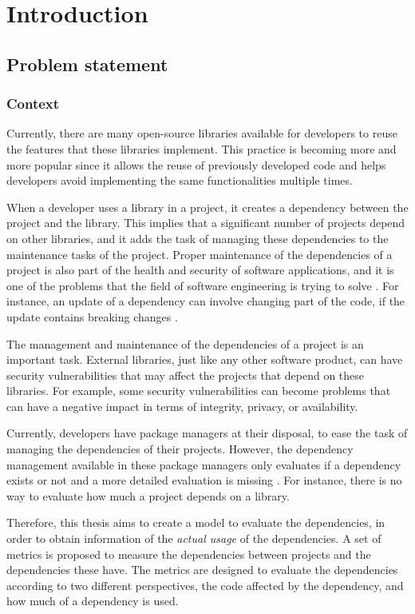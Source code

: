 \chapter{Introduction}\label{ch:Introduction}

\section{Problem statement}

\subsection{Context}
Currently, there are many open-source libraries available for developers to reuse the features that these libraries implement. This practice is becoming more and more popular since it allows the reuse of previously developed code and helps developers avoid implementing the same functionalities multiple times.

When a developer uses a library in a project, it creates a dependency between the project and the library. This implies that a significant number of projects depend on other libraries, and it adds the task of managing these dependencies to the maintenance tasks of the project. Proper maintenance of the dependencies of a project is also part of the health and security of software applications, and it is one of the problems that the field of software engineering is trying to solve \cite{kula2014visualizing}. For instance, an update of a dependency can involve changing part of the code, if the update contains breaking changes \cite{Raemaekers2017}.

The management and maintenance of the dependencies of a project is an important task. External libraries, just like any other software product, can have security vulnerabilities that may affect the projects that depend on these libraries. For example, some security vulnerabilities can become problems that can have a negative impact in terms of integrity, privacy, or availability.

\blankl
Currently, developers have package managers at their disposal, to ease the task of managing the dependencies of their projects. However, the dependency management available in these package managers only evaluates if a dependency exists or not and a more detailed evaluation is missing \cite{hejderup2018prazi}. For instance, there is no way to evaluate how much a project depends on a library.

\blankl
Therefore, this thesis aims to create a model to evaluate the dependencies, in order to obtain information of the \textit{actual usage} of the dependencies. A set of metrics is proposed to measure the dependencies between projects and the dependencies these have. The metrics are designed to evaluate the dependencies according to two different perspectives, the code affected by the dependency, and how much of a dependency is used.

